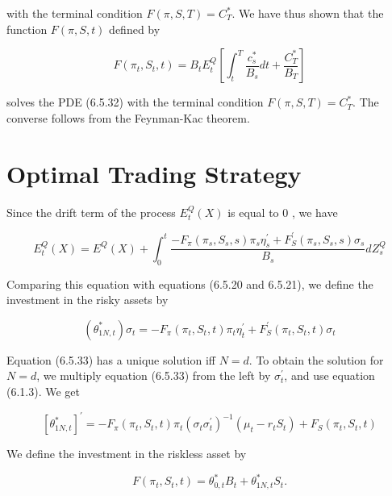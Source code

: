 \documentclass[\topdir/lecture\_notes.tex]{subfiles}
\begin{document}
with the terminal condition \(F(\pi, S, T)=C_{T}^{*}\). We have thus shown that the function \(F(\pi, S, t)\) defined by

\begin{equation}
F\left(\pi_{t}, S_{t}, t\right)=B_{t} E_{t}^{Q}\left[\int_{t}^{T} \frac{c_{s}^{*}}{B_{s}} d t+\frac{C_{T}^{*}}{B_{T}}\right]
\end{equation}

solves the PDE (6.5.32) with the terminal condition \(F(\pi, S, T)=C_{T}^{*}\). The converse follows from the Feynman-Kac theorem.

\section{Optimal Trading Strategy}
Since the drift term of the process \(E_{t}^{Q}(X)\) is equal to 0 , we have

\begin{equation}
E_{t}^{Q}(X)=E^{Q}(X)+\int_{0}^{t} \frac{-F_{\pi}\left(\pi_{s}, S_{s}, s\right) \pi_{s} \eta_{s}^{\prime}+F_{S}^{\prime}\left(\pi_{s}, S_{s}, s\right) \sigma_{s}}{B_{s}} d Z_{s}^{Q}
\end{equation}

Comparing this equation with equations (6.5.20 and 6.5.21), we define the investment in the risky assets by

\begin{equation}
\left(\theta_{1 N, t}^{*}\right) \sigma_{t}=-F_{\pi}\left(\pi_{t}, S_{t}, t\right) \pi_{t} \eta_{t}^{\prime}+F_{S}^{\prime}\left(\pi_{t}, S_{t}, t\right) \sigma_{t} \label{eq:6.5.33}
\end{equation}

Equation (6.5.33) has a unique solution iff \(N=d\). To obtain the solution for \(N=d\), we multiply equation (6.5.33) from the left by \(\sigma_{t}^{\prime}\), and use equation (6.1.3). We get

\begin{equation}
\left[\theta_{1 N, t}^{*}\right]^{\prime}=-F_{\pi}\left(\pi_{t}, S_{t}, t\right) \pi_{t}\left(\sigma_{t} \sigma_{t}^{\prime}\right)^{-1}\left(\mu_{t}-r_{t} S_{t}\right)+F_{S}\left(\pi_{t}, S_{t}, t\right) \label{eq:6.5.34}
\end{equation}

We define the investment in the riskless asset by

\begin{equation}
F\left(\pi_{t}, S_{t}, t\right)=\theta_{0, t}^{*} B_{t}+\theta_{1 N, t}^{*} S_{t} .
\end{equation}
\end{document}
